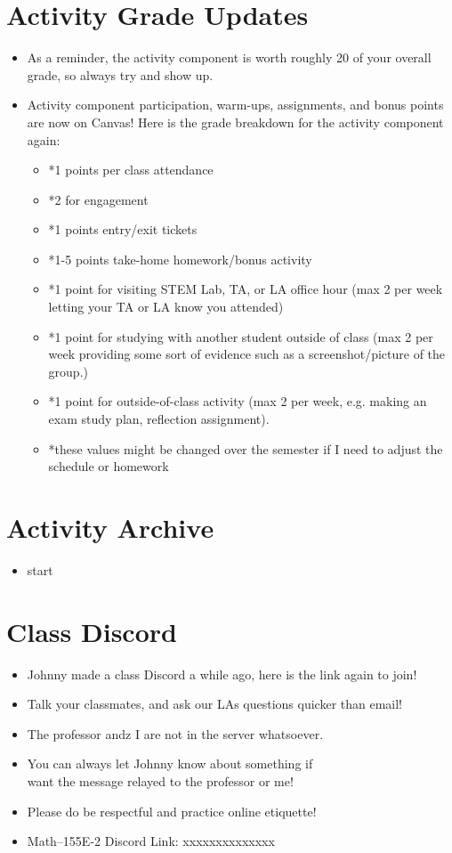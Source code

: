 \documentclass{article}
\begin{document}
\section*{Activity Grade Updates}
\begin{itemize}
    \item As a reminder, the activity component is worth roughly 20 of your overall grade, so always try and show up.
    \item Activity component participation, warm-ups, assignments, and bonus points are now on Canvas!
        Here is the grade breakdown for the activity component again:
        \begin{itemize}
            \item *1 points per class attendance
            \item *2 for engagement
            \item *1 points entry/exit tickets
            \item *1-5 points take-home homework/bonus activity
            \item *1 point for visiting STEM Lab, TA, or LA office 
                hour (max 2 per week letting your TA or LA know you attended)
            \item *1 point for studying with another student outside of class 
            (max 2 per week providing some sort of evidence such as a screenshot/picture of the group.)
            \item *1 point for outside-of-class activity 
            (max 2 per week, e.g. making an exam study plan, reflection assignment).
            \item *these values might be changed over the semester if I need to adjust the schedule or homework
        \end{itemize}

\end{itemize}
\section*{Activity Archive}
\begin{itemize}
    \item start
\end{itemize}
\section*{Class Discord}
\begin{itemize}
    \item Johnny made a class Discord a while ago, here 
    is the link again to join! 
    \item Talk your classmates, and 
    ask our LAs questions quicker than email! 
    \item The professor andz I are not in the server whatsoever.
    \item You can always let Johnny know about something if  \\
    want the message relayed to the professor or me!
    \item Please do be respectful and practice online etiquette!
    \item Math–155E-2 Discord Link: xxxxxxxxxxxxxx
\end{itemize}
\end{document}
